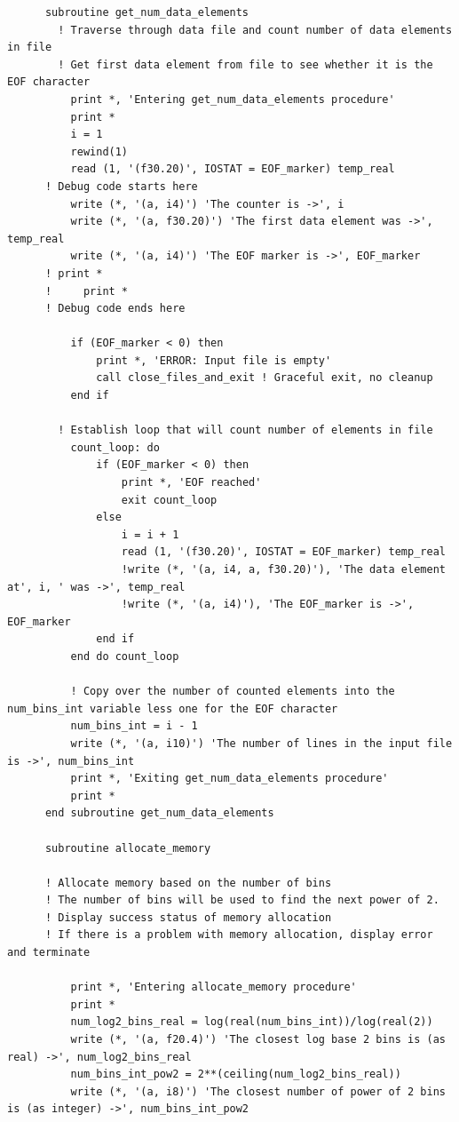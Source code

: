 \begin{verbatim}
      subroutine get_num_data_elements
        ! Traverse through data file and count number of data elements in file
        ! Get first data element from file to see whether it is the EOF character
          print *, 'Entering get_num_data_elements procedure'
          print *
          i = 1
          rewind(1)
          read (1, '(f30.20)', IOSTAT = EOF_marker) temp_real
      !	Debug code starts here
          write (*, '(a, i4)') 'The counter is ->', i
          write (*, '(a, f30.20)') 'The first data element was ->', temp_real
          write (*, '(a, i4)') 'The EOF marker is ->', EOF_marker
      !	print *
      ! 	print *
      !	Debug code ends here
  
          if (EOF_marker < 0) then
              print *, 'ERROR: Input file is empty'
              call close_files_and_exit	! Graceful exit, no cleanup  
          end if
  
        ! Establish loop that will count number of elements in file
          count_loop: do
              if (EOF_marker < 0) then
                  print *, 'EOF reached'
                  exit count_loop
              else
                  i = i + 1
                  read (1, '(f30.20)', IOSTAT = EOF_marker) temp_real
                  !write (*, '(a, i4, a, f30.20)'), 'The data element at', i, ' was ->', temp_real
                  !write (*, '(a, i4)'), 'The EOF_marker is ->', EOF_marker
              end if
          end do count_loop
  
          ! Copy over the number of counted elements into the num_bins_int variable less one for the EOF character
          num_bins_int = i - 1
          write (*, '(a, i10)') 'The number of lines in the input file is ->', num_bins_int
          print *, 'Exiting get_num_data_elements procedure'
          print *
      end subroutine get_num_data_elements
    
      subroutine allocate_memory
      
      ! Allocate memory based on the number of bins
      ! The number of bins will be used to find the next power of 2.
      ! Display success status of memory allocation
      ! If there is a problem with memory allocation, display error and terminate
      
          print *, 'Entering allocate_memory procedure'
          print *
          num_log2_bins_real = log(real(num_bins_int))/log(real(2))
          write (*, '(a, f20.4)') 'The closest log base 2 bins is (as real) ->', num_log2_bins_real
          num_bins_int_pow2 = 2**(ceiling(num_log2_bins_real))
          write (*, '(a, i8)') 'The closest number of power of 2 bins is (as integer) ->', num_bins_int_pow2
      

\end{verbatim}
